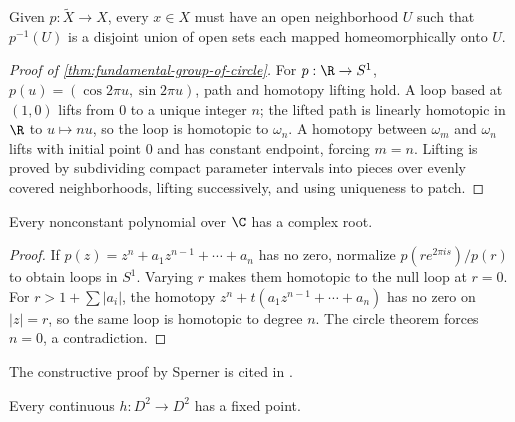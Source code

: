 \begin{definition}
\label{def:covering-space}
\leanok
{}
Given $p:\widetilde X\to X$, every $x\in X$ must have an open neighborhood
$U$ such that $p^{-1}(U)$ is a disjoint union of open sets each mapped
homeomorphically onto $U$.
\end{definition}

\begin{proof}[Proof of \cref{thm:fundamental-group-of-circle}]
\leanok
\sketch For $p:\R\to S^1$, $p(u)=(\cos2\pi u,\sin2\pi u)$, path and homotopy
lifting hold. A loop based at $(1,0)$ lifts from $0$ to a unique integer $n$;
the lifted path is linearly homotopic in $\R$ to $u\mapsto nu$, so the loop is
homotopic to $\omega_n$. A homotopy between $\omega_m$ and $\omega_n$ lifts
with initial point $0$ and has constant endpoint, forcing $m=n$. Lifting is
proved by subdividing compact parameter intervals into pieces over evenly
covered neighborhoods, lifting successively, and using uniqueness to patch.
\end{proof}

\begin{theorem}
\label{thm:fundamental-theorem-of-algebra}
\leanok
{}
Every nonconstant polynomial over $\C$ has a complex root.
\end{theorem}

\begin{proof}
\leanok
\sketch If $p(z)=z^n+a_1z^{n-1}+\cdots+a_n$ has no zero, normalize
$p(re^{2\pi is})/p(r)$ to obtain loops in $S^1$. Varying $r$ makes them
homotopic to the null loop at $r=0$. For $r>1+\sum|a_i|$, the homotopy
$z^n+t(a_1z^{n-1}+\cdots+a_n)$ has no zero on $|z|=r$, so the same loop is
homotopic to degree $n$. The circle theorem forces $n=0$, a contradiction.
\end{proof}

The constructive proof by Sperner is cited in \cite{AignerZiegler1999}.

\begin{theorem}
\label{thm:brouwer-fixed-point-dim2}
\leanok
{}
Every continuous $h:D^2\to D^2$ has a fixed point.
\end{theorem}

